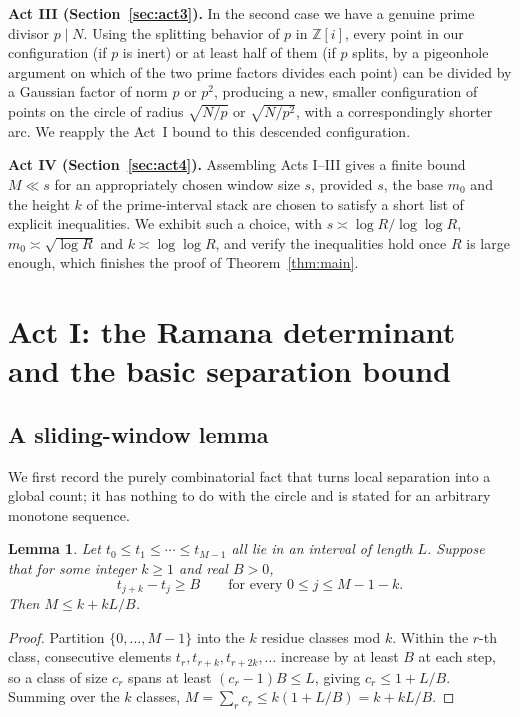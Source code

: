 \documentclass[11pt]{amsart}
\newtheorem{lemma}[theorem]{Lemma}
\theoremstyle{definition}
\theoremstyle{remark}
\newcommand{\Z}{\mathbb{Z}}
\begin{document}
\textbf{Act III (Section~\ref{sec:act3}).} In the second case we have a genuine prime divisor $p\mid N$. Using the splitting behavior of $p$ in $\Z[i]$, every point in our configuration (if $p$ is inert) or at least half of them (if $p$ splits, by a pigeonhole argument on which of the two prime factors divides each point) can be divided by a Gaussian factor of norm $p$ or $p^2$, producing a new, smaller configuration of points on the circle of radius $\sqrt{N/p}$ or $\sqrt{N/p^2}$, with a correspondingly shorter arc. We reapply the Act~I bound to this descended configuration.

\textbf{Act IV (Section~\ref{sec:act4}).} Assembling Acts I--III gives a finite bound $M \ll s$ for an appropriately chosen window size $s$, provided $s$, the base $m_0$ and the height $k$ of the prime-interval stack are chosen to satisfy a short list of explicit inequalities. We exhibit such a choice, with $s \asymp \log R/\log\log R$, $m_0\asymp\sqrt{\log R}$ and $k\asymp \log\log R$, and verify the inequalities hold once $R$ is large enough, which finishes the proof of Theorem~\ref{thm:main}.

\section{Act I: the Ramana determinant and the basic separation bound}\label{sec:act1}

\subsection{A sliding-window lemma}

We first record the purely combinatorial fact that turns local separation into a global count; it has nothing to do with the circle and is stated for an arbitrary monotone sequence.

\begin{lemma}\label{lem:window}
Let $t_0\le t_1\le\cdots\le t_{M-1}$ all lie in an interval of length $L$. Suppose that for some integer $k\ge 1$ and real $B>0$,
\[
t_{j+k} - t_j \ge B \qquad \text{for every } 0\le j \le M-1-k.
\]
Then $M \le k + kL/B$.
\end{lemma}

\begin{proof}
Partition $\{0,\dots,M-1\}$ into the $k$ residue classes mod $k$. Within the $r$-th class, consecutive elements $t_{r}, t_{r+k}, t_{r+2k},\dots$ increase by at least $B$ at each step, so a class of size $c_r$ spans at least $(c_r-1)B \le L$, giving $c_r \le 1+L/B$. Summing over the $k$ classes, $M = \sum_r c_r \le k(1+L/B) = k+kL/B$.
\end{proof}
\end{document}
